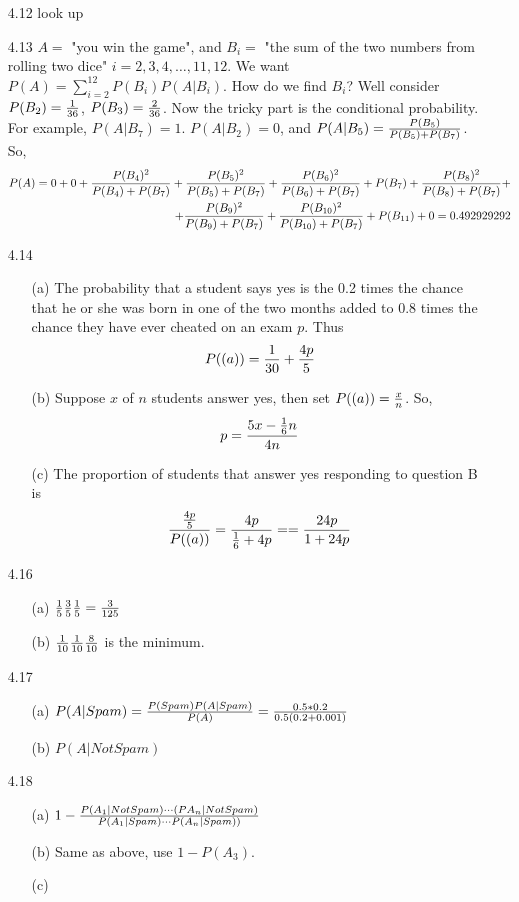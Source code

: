 \documentclass[english, 11pt]{article}
\begin{document}
\begin{itemize}
    \item[4.12] look up
    \item[4.13] $A = $ "you win the game", and $B_i = $ "the sum of the two numbers from rolling two dice" $i = 2,3,4,\ldots,11,12$. We want $P(A) = \sum_{i=2}^{12} P(B_i)P(A|B_i)$. How do we find $B_i$? Well consider $P(B_2) = \frac{1}{36}$, $P(B_3) = \frac{2}{36}$. Now the tricky part is the conditional probability. For example, $P(A|B_7) = 1$. $P(A | B_2) = 0$, and $P(A|B_5) = \frac{P(B_5)}{P(B_5) + P(B_7)}$. So,
    \begin{align*}
      P(A) = 0 + 0 + \frac{P(B_4)^2}{P(B_4) + P(B_7)} + \frac{P(B_5)^2}{P(B_5) + P(B_7)} + \frac{P(B_6)^2}{P(B_6) + P(B_7)} + P(B_7) + \frac{P(B_8)^2}{P(B_8) + P(B_7)} + \\ +  \frac{P(B_9)^2}{P(B_9) + P(B_7)} + \frac{P(B_{10})^2}{P(B_{10}) + P(B_7)} + P(B_{11}) + 0 = 0.492929292
    \end{align*}

    \item[4.14]
    \begin{itemize}
      \item [(a)] The probability that a student says yes is the 0.2 times the chance that he or she was born in one of the two months added to 0.8 times the chance they have ever cheated on an exam $p$. Thus
      \[ P((a)) = \frac{1}{30} + \frac{4p}{5} \]
      \item[(b)] Suppose $x$ of $n$ students answer yes, then set $P((a)) = \frac{x}{n}$. So,
      \[ p = \frac{5x-\frac{1}{6}n}{4n} \]
      \item[(c)] The proportion of students that answer yes responding to question B is \[ \frac{\frac{4p}{5}}{P((a))} = \frac{4p}{\frac{1}{6} + 4p} == \frac{24p}{1+24p}\]
    \end{itemize}

    \item[4.16]
    \begin{itemize}
      \item[(a)] $\frac{1}{5}\frac{3}{5}\frac{1}{5} = \frac{3}{125}$
      \item[(b)] $\frac{1}{10}\frac{1}{10}\frac{8}{10}$ is the minimum.
    \end{itemize}

    \item[4.17]
    \begin{itemize}
      \item[(a)] $P(A|Spam) = \frac{P(Spam)P(A|Spam)}{P(A)} = \frac{0.5*0.2}{0.5(0.2 + 0.001)}$
      \item[(b)] $P(A|NotSpam)$
    \end{itemize}

    \item[4.18]
    \begin{itemize}
      \item[(a)] $1 - \frac{P(A_1|NotSpam)\cdots(PA_n|NotSpam)}{P(A_1|Spam)\cdots P(A_n|Spam))}$
      \item[(b)] Same as above, use $1 - P(A_3)$.
      \item[(c)]
    \end{itemize}

  \end{itemize}
\end{document}
